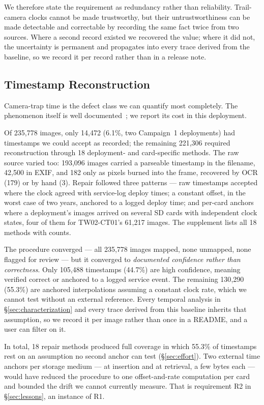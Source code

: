 \documentclass[sigconf]{acmart}
\begin{document}
We therefore state the requirement as redundancy rather than
reliability. Trail-camera clocks cannot be made trustworthy, but their
untrustworthiness can be made detectable and correctable by recording
the same fact twice from two sources. Where a second record existed we
recovered the value; where it did not, the uncertainty is permanent and
propagates into every trace derived from the baseline, so we record it
per record rather than in a release note.

\subsection{Timestamp Reconstruction}
\label{sec:timestamps}

Camera-trap time is the defect class we can quantify most completely.
The phenomenon itself is well
documented~\cite{lahozmonfort2021monitoring}; we report its cost in this
deployment.

Of 235{,}778 images, only 14{,}472 (6.1\%, two Campaign~1 deployments)
had timestamps we could accept as recorded; the remaining
221{,}306 required reconstruction through 18 deployment- and
card-specific methods. The raw source varied too: 193{,}096 images
carried a parseable timestamp in the filename, 42{,}500 in EXIF, and
182 only as pixels burned into the frame, recovered by OCR (179) or by
hand (3). Repair followed three patterns --- raw timestamps accepted
where the clock agreed with service-log deploy times; a constant offset,
in the worst case of two years, anchored to a logged deploy time; and
per-card anchors where a deployment's images arrived on several SD cards
with independent clock states, four of them for TW02-CT01's
61{,}217 images. The supplement lists all 18 methods with counts.

The procedure converged --- all 235{,}778 images mapped, none unmapped,
none flagged for review --- but it converged to \emph{documented
confidence rather than correctness}. Only 105{,}488 timestamps (44.7\%)
are high confidence, meaning verified correct or anchored to a logged
service event. The remaining 130{,}290 (55.3\%) are anchored
interpolations assuming a constant clock rate, which we cannot test
without an external reference. Every temporal analysis in
\S\ref{sec:characterization} and every trace derived from this baseline
inherits that assumption, so we record it per image rather than once in
a README, and a user can filter on it.

In total, 18 repair methods produced full coverage in which 55.3\% of
timestamps rest on an assumption no second anchor can test
(\S\ref{sec:effort}). Two external time anchors per storage medium --- at
insertion and at retrieval, a few bytes each --- would have reduced the
procedure to one offset-and-rate computation per card and bounded the
drift we cannot currently measure. That is requirement R2 in
\S\ref{sec:lessons}, an instance of R1.
\end{document}
